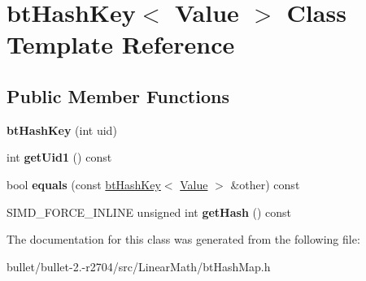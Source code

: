 \hypertarget{classbt_hash_key}{\section{bt\+Hash\+Key$<$ Value $>$ Class Template Reference}
\label{classbt_hash_key}
}
\subsection*{Public Member Functions}
\begin{DoxyCompactItemize}
\item 
\hypertarget{classbt_hash_key_a68fa09a098d65535e9a4293af4c4669a}{{\bfseries bt\+Hash\+Key} (int uid)}\label{classbt_hash_key_a68fa09a098d65535e9a4293af4c4669a}

\item 
\hypertarget{classbt_hash_key_a80c67a8ac13da969030bafcacb2bb482}{int {\bfseries get\+Uid1} () const }\label{classbt_hash_key_a80c67a8ac13da969030bafcacb2bb482}

\item 
\hypertarget{classbt_hash_key_a61bb3f323f272e4684b612eba5967d81}{bool {\bfseries equals} (const \hyperlink{classbt_hash_key}{bt\+Hash\+Key}$<$ \hyperlink{union_value}{Value} $>$ \&other) const }\label{classbt_hash_key_a61bb3f323f272e4684b612eba5967d81}

\item 
\hypertarget{classbt_hash_key_ae9a95cd2eb900d18d9b9116c06647b7e}{S\+I\+M\+D\+\_\+\+F\+O\+R\+C\+E\+\_\+\+I\+N\+L\+I\+N\+E unsigned int {\bfseries get\+Hash} () const }\label{classbt_hash_key_ae9a95cd2eb900d18d9b9116c06647b7e}

\end{DoxyCompactItemize}


The documentation for this class was generated from the following file\+:\begin{DoxyCompactItemize}
\item 
bullet/bullet-\/2.-\/r2704/src/\+Linear\+Math/bt\+Hash\+Map.\+h\end{DoxyCompactItemize}
